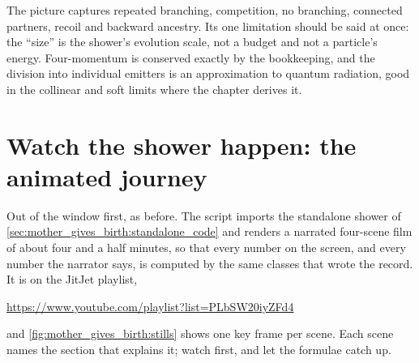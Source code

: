 The picture captures repeated branching, competition, no branching,
connected partners, recoil and backward ancestry. Its one limitation should
be said at once: the ``size'' is the shower's evolution scale, not a budget
and not a particle's energy. Four-momentum is conserved exactly by the
bookkeeping, and the division into individual emitters is an approximation
to quantum radiation, good in the collinear and soft limits where the
chapter derives it.

\section{Watch the shower happen: the animated journey}
\label{sec:mother_gives_birth:animation}

Out of the window first, as before. The script
imports the standalone shower of \cref{sec:mother_gives_birth:standalone_code}
and renders a narrated four-scene film of about four and a half minutes, so
that every number on the screen, and every number the narrator says, is
computed by the same classes that wrote the record. It is
on the JitJet playlist,
\begin{center}
  \url{https://www.youtube.com/playlist?list=PLbSW20iyZFd4}
\end{center}
and \cref{fig:mother_gives_birth:stills} shows one key frame per scene.
Each scene names the section that explains it; watch first, and let the
formulae catch up.
